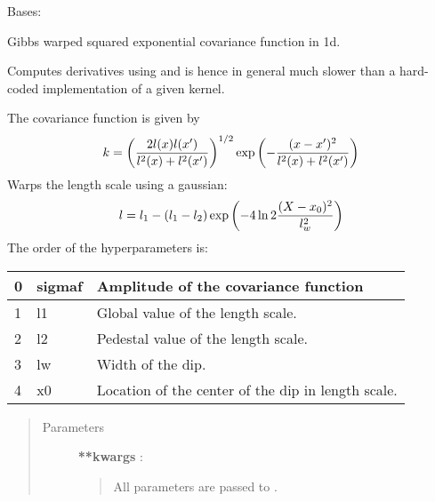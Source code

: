 \documentclass[letterpaper,10pt,english]{sphinxmanual}
\begin{document}

\begin{fulllineitems}
\label{gptools.kernel:gptools.kernel.gibbs.GibbsKernel1dGauss}
Bases: {\hyperref[gptools.kernel:gptools.kernel.core.ArbitraryKernel]{}}

Gibbs warped squared exponential covariance function in 1d.

Computes derivatives using  and is hence in general
much slower than a hard-coded implementation of a given kernel.

The covariance function is given by
\begin{gather}
\begin{split}k = \left ( \frac{2l(x)l(x')}{l^2(x)+l^2(x')} \right )^{1/2}\exp\left ( -\frac{(x-x')^2}{l^2(x)+l^2(x')} \right )\end{split}\notag
\end{gather}
Warps the length scale using a gaussian:
\begin{gather}
\begin{split}l = l_1 - (l_1 - l_2) \exp\left ( -4\ln 2\frac{(X-x_0)^2}{l_{w}^{2}} \right )\end{split}\notag
\end{gather}
The order of the hyperparameters is:

\begin{tabulary}{\linewidth}{|L|L|L|}
\hline

0
 & 
sigmaf
 & 
Amplitude of the covariance function
\\\hline

1
 & 
l1
 & 
Global value of the length scale.
\\\hline

2
 & 
l2
 & 
Pedestal value of the length scale.
\\\hline

3
 & 
lw
 & 
Width of the dip.
\\\hline

4
 & 
x0
 & 
Location of the center of the dip in length scale.
\\\hline
\end{tabulary}

\begin{quote}\begin{description}
\item[{Parameters }] \leavevmode
\textbf{**kwargs} :
\begin{quote}

All parameters are passed to {\hyperref[gptools.kernel:gptools.kernel.core.Kernel]{}}.
\end{quote}

\end{description}\end{quote}

\end{fulllineitems}
\end{document}
